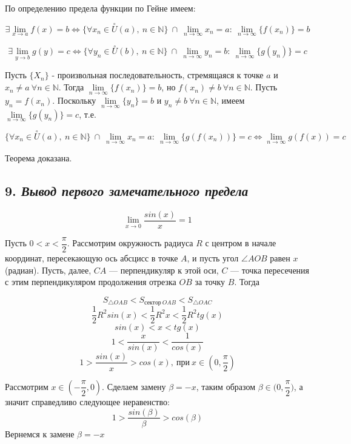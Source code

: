 По определению предела функции по Гейне имеем:

$$
\exists \lim\limits_{x \to a}f(x) = b \iff \{\forall x_n \in \overset{\circ}U(a), \ n \in \mathbb{N}\} \ \cap \ \lim\limits_{n \to \infty}{x_n} = a : \ \lim\limits_{n \to \infty}\{f(x_n)\} = b
$$

$$
\exists \lim\limits_{y \to b}g(y) = c \iff \{\forall y_n \in \overset{\circ}U(b), \ n \in \mathbb{N}\} \ \cap \ \lim\limits_{n \to \infty}{y_n} = b : \ \lim\limits_{n \to \infty}\{g(y_n)\} = c
$$

Пусть $\{X_n\}$ - произвольная последовательность, стремящаяся к точке $a$ и $x_n \neq a \ \forall n \in \mathbb{N}$. Тогда $\lim\limits_{n \to \infty}{\{f(x_n)\}} = b$, но $f(x_n) \neq b \ \forall n \in \mathbb{N}$. Пусть $y_n = f(x_n)$. Поскольку $\lim\limits_{n \to \infty}{\{y_n\}} = b$ и $y_n \neq b \ \forall n \in \mathbb{N}$, имеем $\lim\limits_{n \to \infty}{\{g(y_n)\}} = c$, т.е.

$$
\{\forall x_n \in \overset{\circ}U(a), \ n \in \mathbb{N}\} \ \cap \ \lim\limits_{n \to \infty}{x_n} = a : \ \lim\limits_{n \to \infty}\{g(f(x_n))\} = c \iff \lim\limits_{n \to \infty} g(f(x)) = c
$$

Теорема доказана.
\newpage 
\subsection*{9. \textit{Вывод первого замечательного предела}}
\begin{mainQuote}

$$ \lim\limits_{x \to 0} {\dfrac{sin(x)}{x}} = 1 $$
\end{mainQuote}

Пусть $0 < x < {\dfrac{\pi}{2}}$. Рассмотрим окружность радиуса $R$ с центром в начале координат, пересекающую ось абсцисс в точке $A$, и пусть угол $\angle AOB$ равен $x$ (радиан). Пусть, далее, $CA$ — перпендикуляр к этой оси, $C$ — точка пересечения с этим перпендикуляром продолжения отрезка $OB$ за точку $B$. Тогда

$$S_{\triangle OAB} < S_{сектор \ OAB} < S_{\triangle OAC}$$ $$\dfrac{1}{2}R^2sin(x) <\dfrac{1}{2}R^2x < \dfrac{1}{2}R^2tg(x)$$ $$sin(x) < x < tg(x)$$ $$1 < \dfrac{x}{sin(x)} < \dfrac{1}{cos(x)}$$ $$1 > \dfrac{sin(x)}{x} > cos(x), \ \text{при} \ x \in (0, \dfrac{\pi}{2})$$

Рассмотрим $x \in (-{\dfrac{\pi}{2}}, 0)$. Сделаем замену $\beta = -x$, таким образом $\beta \in (0, {\dfrac{\pi}{2})}$, а значит справедливо следующее неравенство: $$1 > \dfrac{sin(\beta)}{\beta} > cos(\beta)$$ Вернемся к замене $\beta = -x$

